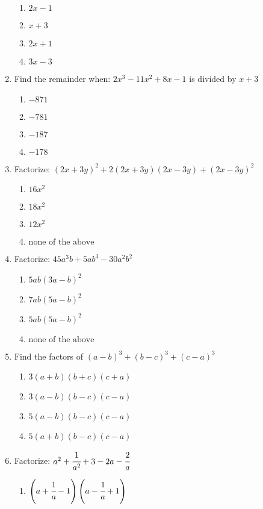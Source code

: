 \begin{multicols}{2}
\begin{enumerate}[label={\arabic*.}]
	\begin{enumerate}[label={\Alph*.}]
	\item \(2x -1\)
	\item \(x+3\)
	\item \(2x + 1\)
	\item \(3x -3\)
	\end{enumerate}
\item Find the remainder when: $2x^3 -11x^2 + 8x -1$ is divided by $x+3$ 
	\begin{enumerate}[label={\Alph*.}]
	\item \(-871\)
	\item \(-781\)
	\item \(-187\)
	\item \(-178\)
	\end{enumerate}
\item Factorize: $(2x + 3y)^2 + 2(2x + 3y)(2x - 3y) + (2x - 3y)^2$
	\begin{enumerate}[label={\Alph*.}]
	\item \(16x^2\)
	\item \(18x^2\)
	\item \(12x^2\)
	\item \(\text{none of the above }\)
	\end{enumerate}
\item Factorize: $45a^3b + 5ab^3 -30a^2b^2$
	\begin{enumerate}[label={\Alph*.}]
	\item \(5ab(3a -b)^2\)
	\item \(7ab(5a - b)^2\)
	\item \(5ab(5a - b)^2\)
	\item \(\text{none of the above}\)
	\end{enumerate}
\item Find the factors of $(a-b)^3 + (b-c)^3 + (c-a)^3$
	\begin{enumerate}[label={\Alph*.}]
	\item \(3(a+b)(b+c)(c+a)\)
	\item \(3(a-b)(b-c)(c-a)\)
	\item \(5(a-b)(b-c)(c-a)\)
	\item \(5(a+b)(b-c)(c-a)\)
	\end{enumerate}
\item Factorize: $a^2 + \cfrac{1}{a^2} + 3 - 2a - \cfrac{2}{a}$ \\
	\begin{enumerate}[label={\Alph*.}]
	\item \(\left(a+ \cfrac{1}{a} - 1\right)\left(a - \cfrac{1}{a} + 1\right)\)

\end{enumerate}
\end{enumerate}
\end{multicols}
